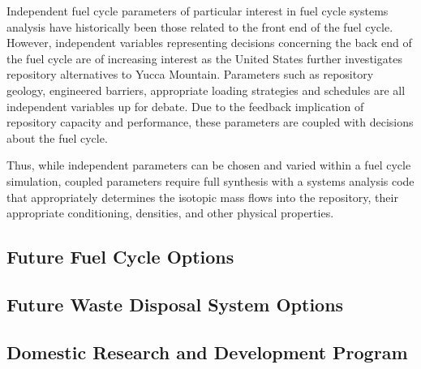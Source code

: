 
Independent fuel cycle parameters of particular interest in fuel cycle systems 
analysis have historically been those related to the front end of the fuel 
cycle.
However, independent variables representing decisions concerning the back end
of the fuel cycle are of increasing interest as the United States further
investigates repository alternatives to Yucca Mountain.  Parameters such as
repository geology, engineered barriers, appropriate loading strategies and
schedules are all independent variables up for debate. Due to the feedback 
implication of repository capacity and performance, these
parameters are coupled with decisions about the fuel cycle. 


Thus, while independent parameters can be chosen and varied within a fuel cycle 
simulation, coupled parameters require full synthesis with a systems analysis 
code that appropriately determines the isotopic mass flows into the repository, 
their appropriate conditioning, densities, and other physical properties.  

\subsection{Future Fuel Cycle Options}

\subsection{Future Waste Disposal System Options}

\subsection{Domestic Research and Development Program}


